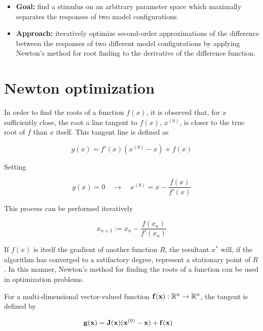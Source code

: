 \documentclass{article}
\newcommand{\R}{\mathbb{R}}
\newcommand{\vect}[1]{\textbf{\textrm{#1}}}
\begin{document}
\begin{itemize}[label={}]
	\item \textbf{Goal:} find a stimulus on an arbitrary parameter space which maximally separates 	
		  the responses of two model configurations.
	\item \textbf{Approach:} iteratively optimize second-order approximations of the difference    
	      between the responses of two different model configurations by applying Newton's method 			  for root finding to the derivative of the difference function.
\end{itemize}


\section{Newton optimization} \label{newtonmethod}
In order to find the roots of a function $f(x)$, it is observed that, for $x$ sufficiently close, the root a line tangent to $f(x)$, $x^{(0)}$, is closer to the true root of $f$ than $x$ itself. 
This tangent line is defined as

\begin{equation} \label{tangent1d}
	g(x) = f'(x)(x^{(0)} - x) + f(x)
\end{equation}

Setting

\begin{equation*}
	g(x) = 0 \quad \longrightarrow \quad x^{(0)} = x - \frac{f(x)}{f'(x)}
\end{equation*}

This process can be performed iteratively

\begin{equation} \label{updaterule1d}
	x_{n+1} := x_n - \frac{f(x_n)}{f'(x_n)}
\end{equation}

If $f(x)$ is itself the gradient of another function $R$, the resultant $x^*$ will, if the algorithm has converged to a satifactory degree, represent a stationary point of $R$. 
In this manner, Newton's method for finding the roots of a function can be used in optimization problems. \par 
\hfill \newline
For a multi-dimensional vector-valued function $\vect{f}(\vect{x}): \R^n \rightarrow \R^n$, the tangent is defined by

\begin{align} \label{tangent}
	\vect{g}(\vect{x}) & = \vect{J}(\vect{x})(\vect{x}^{(0)} - \vect{x}) + \vect{f}(\vect{x})
\end{align}
\end{document}
